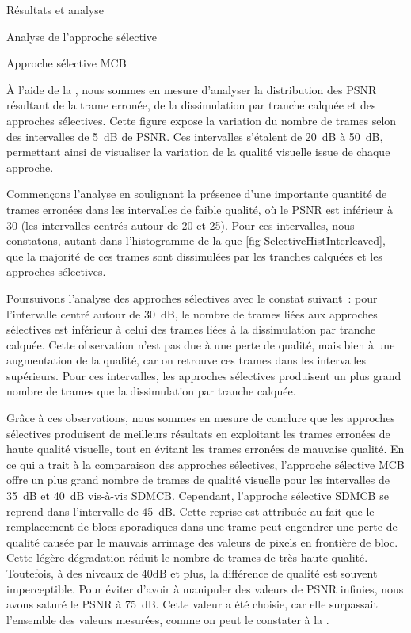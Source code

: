 \begin{chapter}{Résultats et analyse}
\begin{section}{Analyse de l'approche sélective}
\begin{subsection}{Approche sélective MCB}
\FloatBarrier
\end{subsection}

À l'aide de la , nous sommes en mesure d'analyser la
distribution des PSNR résultant de la trame erronée, de la dissimulation par
tranche calquée et des approches sélectives. Cette figure expose la variation du
nombre de trames selon des intervalles de 5~dB de PSNR. Ces intervalles
s'étalent de 20~dB à 50~dB, permettant ainsi de visualiser la variation de la
qualité visuelle issue de chaque approche.

Commençons l'analyse en soulignant la présence d'une importante quantité de
trames erronées dans les intervalles de faible qualité, où le PSNR est inférieur
à 30 (les intervalles centrés autour de 20 et 25). Pour ces intervalles, nous
constatons, autant dans l'histogramme de la  que
\ref{fig-SelectiveHistInterleaved}, que la majorité de ces trames sont
dissimulées par les tranches calquées et les approches sélectives.

Poursuivons l'analyse des approches sélectives avec le constat suivant~: pour
l'intervalle centré autour de 30~dB, le nombre de trames liées aux approches
sélectives est inférieur à celui des trames liées à la dissimulation par tranche
calquée. Cette observation n'est pas due à une perte de qualité, mais bien à une
augmentation de la qualité, car on retrouve ces trames dans les intervalles
supérieurs. Pour ces intervalles, les approches sélectives produisent un plus
grand nombre de trames que la dissimulation par tranche calquée.

Grâce à ces observations, nous sommes en mesure de conclure que les approches
sélectives produisent de meilleurs résultats en exploitant les trames erronées
de haute qualité visuelle, tout en évitant les trames erronées de mauvaise
qualité. En ce qui a trait à la comparaison des approches sélectives, l'approche
sélective MCB offre un plus grand nombre de trames de qualité visuelle pour les
intervalles de 35~dB et 40~dB vis-à-vis SDMCB. Cependant, l'approche sélective
SDMCB se reprend dans l'intervalle de 45~dB. Cette reprise est attribuée au fait
que le remplacement de blocs sporadiques dans une trame peut engendrer une perte
de qualité causée par le mauvais arrimage des valeurs de pixels en frontière de
bloc. Cette légère dégradation réduit le nombre de trames de très haute qualité.
Toutefois, à des niveaux de 40dB et plus, la différence de qualité est souvent
imperceptible. Pour éviter d'avoir à manipuler des valeurs de PSNR infinies,
nous avons saturé le PSNR à 75~dB. Cette valeur a été choisie, car elle
surpassait l'ensemble des valeurs mesurées, comme on peut le constater à la
.


\end{section}
\end{chapter}
